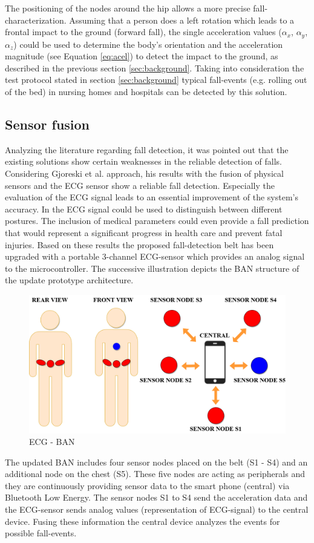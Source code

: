 \documentclass[review]{elsarticle}
\begin{document}
The positioning of the nodes around the hip allows a more precise fall-characterization. Assuming that a person does a left rotation which leads to a frontal impact to the ground (forward fall), the single acceleration values ($\alpha_x$,  $\alpha_y$,  $\alpha_z$) could be used to determine the body's orientation and the acceleration magnitude (see Equation \ref*{eq:acel}) to detect the impact to the ground, as described in the previous section \ref{sec:background}. Taking into consideration the test protocol stated in section \ref{sec:background} typical fall-events (e.g. rolling out of the bed) in nursing homes and hospitals can be detected by this solution.


\subsection{Sensor fusion}
\label{subsec:sensorfusion}	
Analyzing the literature regarding fall detection, it was pointed out that the existing solutions show certain weaknesses in the reliable detection of falls. Considering Gjoreski et al. approach, his results with the fusion of physical sensors and the ECG sensor show a reliable fall detection. Especially the evaluation of the ECG signal leads to an essential improvement of the system's accuracy.  In \cite{Gjoreski2014} the ECG signal could be used to distinguish between different postures. The inclusion of medical parameters could even provide a fall prediction that would represent a significant progress in health care and prevent fatal injuries. Based on these results the proposed fall-detection belt  has been upgraded with a portable 3-channel ECG-sensor which provides an analog signal to the microcontroller. The successive illustration depicts the BAN structure of the update prototype architecture.
\begin{figure}[!ht]
	\centering
	\includegraphics[scale=0.27]{images/ECG-BAN.png}
	\caption[ECG - BAN]{ECG - BAN}
	\label{fig:ECGBAN}
\end{figure}
The updated BAN includes four sensor nodes placed on the belt (S1 - S4) and an additional node on the chest (S5). These five nodes are acting as peripherals and they are continuously providing sensor data to the smart phone (central) via Bluetooth Low Energy. The sensor nodes S1 to S4 send the acceleration data and the ECG-sensor sends analog values (representation of ECG-signal) to the central device. Fusing these information the central device analyzes the events for possible fall-events.
\end{document}
